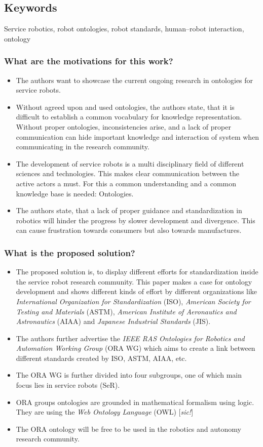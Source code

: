     
    \subsection*{Keywords}
    Service robotics, robot ontologies, robot standards, human–robot interaction, ontology
    
     
    \subsubsection*{What are the motivations for this work?}
    \begin{itemize}
        \item The authors want to showcase the current ongoing research in ontologies for service robots. 
        \item Without agreed upon and used ontologies, the authors state, that it is difficult to establish a common vocabulary for knowledge representation. Without proper ontologies, inconsistencies arise, and a lack of proper communication can hide important knowledge and interaction of system when communicating in the research community.
        \item The development of service robots is a multi disciplinary field of different sciences and technologies. This makes clear communication between the active actors a must. For this a common understanding and a common knowledge base is needed: Ontologies.
        \item The authors state, that a lack of proper guidance and standardization in robotics will hinder the progress by slower development and divergence. This can cause frustration towards consumers but also towards manufactures.
    \end{itemize}
    \subsubsection*{What is the proposed solution?}
    \begin{itemize}
        \item The proposed solution is, to display different efforts for standardization inside the service robot research community. This paper makes a case for ontology development and shows different kinds of effort by different organizations like \emph{International Organization for Standardization} (ISO), \emph{American Society for Testing and Materials} (ASTM), \emph{American Institute of Aeronautics and Astronautics} (AIAA) and \emph{Japanese Industrial Standards} (JIS). 
        \item The authors further advertise the \emph{IEEE RAS Ontologies for Robotics and Automation Working Group} (ORA WG) which aims to create a link between different standards created by ISO, ASTM, AIAA, etc.
        \item The ORA WG is further divided into four subgroups, one of which main focus lies in service robots (SeR).
        \item ORA groups ontologies are grounded in mathematical formalism using logic. They are using the \emph{Web Ontology Language} (OWL) [\emph{sic!}]
        \item The ORA ontology will be free to be used in the robotics and autonomy research community.
    \end{itemize}
